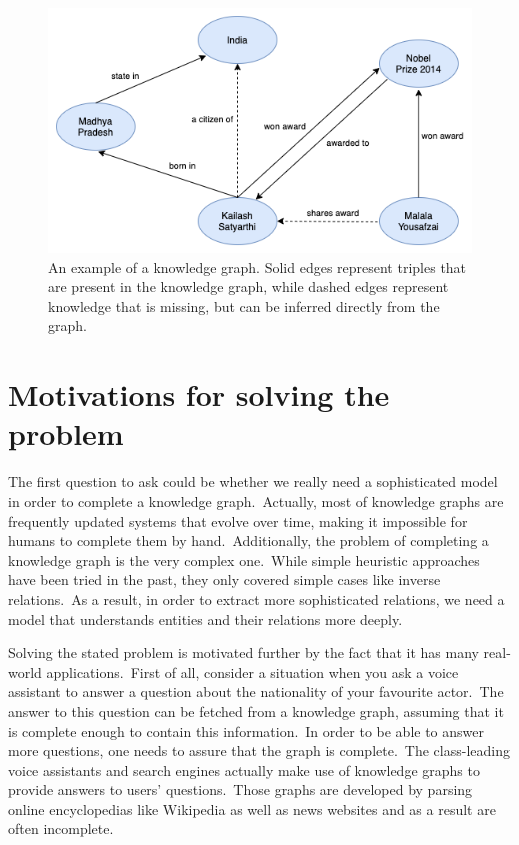 \documentclass[longabstract, english, mgr]{iithesis}
\theoremstyle{default_theorem_style}\newtheorem{theorem}{Theorem}
\theoremstyle{default_theorem_style}\newtheorem{definition}{Definition}
\begin{document}
\begin{figure}[H]
\centering
\includegraphics[scale=0.6]{knowledge_graph}
\caption{An example of a knowledge graph. Solid edges represent triples that are present in the knowledge graph, while
dashed edges represent knowledge that is missing, but can be inferred directly from the graph.}
\label{fig:knowledge_graph}
\end{figure}


\section{Motivations for solving the problem}

The first question to ask could be whether we really need a sophisticated model in order to complete a knowledge
graph.\ Actually, most of knowledge graphs are frequently updated systems that evolve over time, making it impossible
for humans to complete them by hand.\ Additionally, the problem of completing a knowledge graph is the very complex
one.\ While simple heuristic approaches have been tried in the past, they only covered simple cases like inverse
relations.\ As a result, in order to extract more sophisticated relations, we need a model that understands
entities and their relations more deeply.\newline

\noindent Solving the stated problem is motivated further by the fact that it has many real-world
applications.\ First of all, consider a situation when you ask a voice assistant to answer a question about the
nationality of your favourite actor.\ The answer to this question can be fetched from a knowledge graph, assuming that
it is complete enough to contain this information.\ In order to be able to answer more questions, one needs to assure
that the graph is complete.\ The class-leading voice assistants and search engines actually make use
of knowledge graphs to provide answers to users' questions.\ Those graphs are developed by parsing online
encyclopedias like Wikipedia as well as news websites and as a result are often incomplete.\newline
\end{document}
